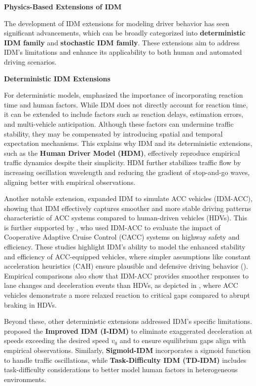 \documentclass[a4paper,fleqn,11pt]{reviewresponse}
\renewenvironment{quotation}
  {\begingroup\color{customblue}%
   \captionsetup{labelfont={bf},textfont={color=customblue},font={color=customblue}}%
   \list{}{\leftmargin=0em \rightmargin=0em} %
   \item\relax\small}
  {\endlist\endgroup}
\begin{document}
\begin{quotation}\noindent

\textbf{Physics-Based Extensions of IDM}

The development of IDM extensions for modeling driver behavior has seen significant advancements, which can be broadly categorized into \textbf{deterministic IDM family} and \textbf{stochastic IDM family}. These extensions aim to address IDM's limitations and enhance its applicability to both human and automated driving scenarios.

\textbf{Deterministic IDM Extensions}

For deterministic models, \cite{treiber_delays_2006} emphasized the importance of incorporating reaction time and human factors. While IDM does not directly account for reaction time, it can be extended to include factors such as reaction delays, estimation errors, and multi-vehicle anticipation. Although these factors can undermine traffic stability, they may be compensated by introducing spatial and temporal expectation mechanisms. This explains why IDM and its deterministic extensions, such as the \textbf{Human Driver Model (HDM)}, effectively reproduce empirical traffic dynamics despite their simplicity. HDM further stabilizes traffic flow by increasing oscillation wavelength and reducing the gradient of stop-and-go waves, aligning better with empirical observations.

Another notable extension, \cite{kestingAdaptiveCruiseControlDesign2008} expanded IDM to simulate ACC vehicles (IDM-ACC), showing that IDM effectively captures smoother and more stable driving patterns characteristic of ACC systems compared to human-driven vehicles (HDVs). This is further supported by \cite{li_evaluating_2017,li_evaluation_2017}, who used IDM-ACC to evaluate the impact of Cooperative Adaptive Cruise Control (CACC) systems on highway safety and efficiency. These studies highlight IDM's ability to model the enhanced stability and efficiency of ACC-equipped vehicles, where simpler assumptions like constant acceleration heuristics (CAH) ensure plausible and defensive driving behavior (\cite{treiberTrafficFlowDynamics2013}). Empirical comparisons also show that IDM-ACC provides smoother responses to lane changes and deceleration events than HDVs, as depicted in \cite{kestingAdaptiveCruiseControlDesign2008}, where ACC vehicles demonstrate a more relaxed reaction to critical gaps compared to abrupt braking in HDVs.

Beyond these, other deterministic extensions addressed IDM's specific limitations. \cite{treiberTrafficFlowDynamics2013} proposed the \textbf{Improved IDM (I-IDM)} to eliminate exaggerated deceleration at speeds exceeding the desired speed \(v_0\) and to ensure equilibrium gaps align with empirical observations. Similarly, \textbf{Sigmoid-IDM} \cite{chen_sigmoid-based_2024} incorporates a sigmoid function to handle traffic oscillations, while \textbf{Task-Difficulty IDM (TD-IDM)} \cite{saifuzzamanIncorporatingHumanFactorsCarFollowingModels2014c} includes task-difficulty considerations to better model human factors in heterogeneous environments.


\end{quotation}
\end{document}
